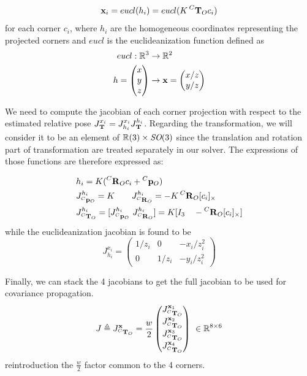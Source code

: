 \begin{equation}
    {\bf x}_i = eucl(h_i) = eucl(K\prescript{C}{}{{\bf T}}_{O} c_i)
\end{equation}
for each corner $c_i$, where $h_i$ are the homogeneous coordinates representing the projected corners and $eucl$ is the euclideanization function defined as
\begin{equation}
    \begin{split}
        eucl: \mathbb{R}^3 &\rightarrow \mathbb{R}^2 \\
        h = \begin{pmatrix}x\\y\\z\end{pmatrix} &\rightarrow {\bf x} = \begin{pmatrix}x/z\\y/z\end{pmatrix}
    \end{split}
\end{equation}

We need to compute the jacobian of each corner projection with respect to the estimated relative pose $J^{x_i}_{\prescript{}{}{{\bf T}}_{}} = J^{x_i}_{h_i} J^{h_i}_{\prescript{}{}{{\bf T}}_{}}$. 
Regarding the transformation, we will consider it to be an element of $\mathbb{R}(3)\times \textit{SO}(3)$ since the translation and rotation part 
of transformation are treated separately in our solver. The expressions of those functions are therefore expressed as:

\begin{equation}
    \begin{split}
        &h_i = K(\prescript{C}{}{{\bf R}}_{O}c_i + \prescript{C}{}{{\bf p}}_{O}) \\
        &J^{h_i}_{\prescript{C}{}{{\bf p}}_{O}} = K ~~~~~~ J^{h_i}_{\prescript{C}{}{{\bf R}}_{O}} = -K\prescript{C}{}{{\bf R}}_{O}[c_i]_{\times}  \\  
        &J^{h_i}_{\prescript{C}{}{{\bf T}}_{O}} = [J^{h_i}_{\prescript{C}{}{{\bf p}}_{O}} ~J^{h_i}_{\prescript{C}{}{{\bf R}}_{O}}] = K [I_3 ~~~ -\prescript{C}{}{{\bf R}}_{O} [c_i]_{\times}]
    \end{split}
\end{equation}
while the euclideanization jacobian is found to be
\begin{equation}
    J^{x_i}_{h_i}
    =
    \begin{pmatrix}
    1/z_i & 0 & -x_i/z_i^2 \\
    0 & 1/z_i & -y_i/z_i^2
    \end{pmatrix}
\end{equation}


Finally, we can stack the 4 jacobians to get the full jacobian to be used for covariance propagation.
\begin{equation}
    J \triangleq J^{{\bf x}}_{\prescript{C}{}{{\bf T}}_{O}}=
    \frac{w}{2}
    \begin{pmatrix}
    J^{{\bf x}_1}_{\prescript{C}{}{{\bf T}}_{O}} \\ J^{{\bf x}_2}_{\prescript{C}{}{{\bf T}}_{O}} \\ J^{{\bf x}_3}_{\prescript{C}{}{{\bf T}}_{O}} \\ J^{{\bf x}_4}_{\prescript{C}{}{{\bf T}}_{O}}
    \end{pmatrix}
    ~ \in \mathbb{R}^{8 \times 6}
\end{equation}
reintroduction the $\frac{w}{2}$ factor common to the 4 corners. 


